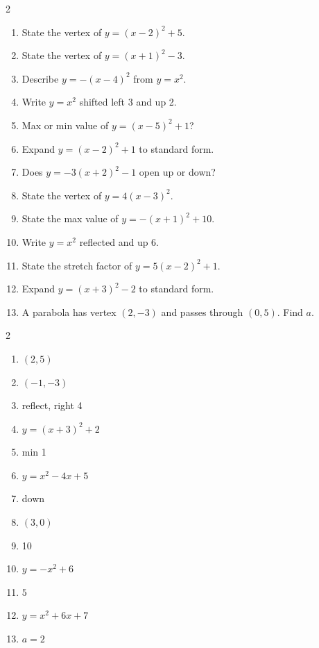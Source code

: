 \documentclass[11pt]{article}
\begin{document}
\begin{recapbox}
\begin{multicols}{2}
\small
\begin{enumerate}[leftmargin=*,itemsep=3pt]
  \item State the vertex of $y=(x-2)^2+5$.
  \item State the vertex of $y=(x+1)^2-3$.
  \item Describe $y=-(x-4)^2$ from $y=x^2$.
  \item Write $y=x^2$ shifted left 3 and up 2.
  \item Max or min value of $y=(x-5)^2+1$?
  \item Expand $y=(x-2)^2+1$ to standard form.
  \item Does $y=-3(x+2)^2-1$ open up or down?
  \item State the vertex of $y=4(x-3)^2$.
  \item State the max value of $y=-(x+1)^2+10$.
  \item Write $y=x^2$ reflected and up 6.
  \item State the stretch factor of $y=5(x-2)^2+1$.
  \item Expand $y=(x+3)^2-2$ to standard form.
  \item A parabola has vertex $(2,-3)$ and passes through $(0,5)$. Find $a$.
\end{enumerate}
\end{multicols}
\end{recapbox}

\begin{keybox}
\begin{multicols}{2}
\small
\begin{enumerate}[leftmargin=*,itemsep=3pt]
  \item $(2,5)$
  \item $(-1,-3)$
  \item reflect, right 4
  \item $y=(x+3)^2+2$
  \item min 1
  \item $y=x^2-4x+5$
  \item down
  \item $(3,0)$
  \item 10
  \item $y=-x^2+6$
  \item $5$
  \item $y=x^2+6x+7$
  \item $a=2$
\end{enumerate}
\end{multicols}
\end{keybox}
\end{document}
